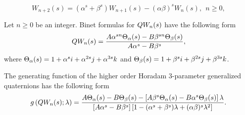 \documentclass[10pt,a4paper]{amsart}
\begin{document}
\begin{equation}\label{e2}
W_{n+2}(s)=\left(\alpha^{s}+\beta^{s}\right)W_{n+1}(s)-\left(\alpha\beta\right)^{s}W_{n}(s),\ \ n\geq 0,
\end{equation}

\begin{theorem}\label{t3}
Let $n\geq 0$ be an integer. Binet formulas for $\textnormal{\textbf{Q}}W_{n}(s)$ have the following form
\[
\textnormal{\textbf{Q}}W_{n}(s)=\frac{A\alpha^{sn}\Theta_{\alpha}(s)-B\beta^{sn}\Theta_{\beta}(s)}{A\alpha^{s}-B\beta^{s}},
\]
where $\Theta_{\alpha}(s)=\textnormal{\textbf{1}}+\alpha^{s}\textnormal{\textbf{i}}+\alpha^{2s}\textnormal{\textbf{j}}+\alpha^{3s}\textnormal{\textbf{k}}$ and $\Theta_{\beta}(s)=\textnormal{\textbf{1}}+\beta^{s}\textnormal{\textbf{i}}+\beta^{2s}\textnormal{\textbf{j}}+\beta^{3s}\textnormal{\textbf{k}}$.
\end{theorem}

\begin{theorem}
The generating function of the higher order Horadam 3-parameter generalized quaternions has the following form
\[
g\left(\textnormal{\textbf{Q}}W_{n}(s);\lambda\right)=\frac{A\Theta_{\alpha}(s)-B\Theta_{\beta}(s)-\left[A\beta^{s}\Theta_{\alpha}(s)-B\alpha^{s}\Theta_{\beta}(s)\right]\lambda}{\left[A\alpha^{s}-B\beta^{s}\right]\left[1-(\alpha^{s}+\beta^{s})\lambda+(\alpha\beta)^{s}\lambda^{2}\right]}.
\]
\end{theorem}
\end{document}
